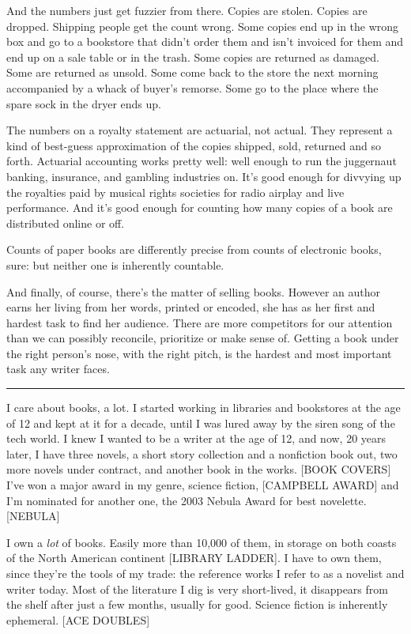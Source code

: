 And the numbers just get fuzzier from there. Copies are stolen.
Copies are dropped. Shipping people get the count wrong. Some
copies end up in the wrong box and go to a bookstore that didn't
order them and isn't invoiced for them and end up on a sale table
or in the trash. Some copies are returned as damaged. Some are
returned as unsold. Some come back to the store the next morning
accompanied by a whack of buyer's remorse. Some go to the place
where the spare sock in the dryer ends up.

The numbers on a royalty statement are actuarial, not actual. They
represent a kind of best-guess approximation of the copies shipped,
sold, returned and so forth. Actuarial accounting works pretty
well: well enough to run the juggernaut banking, insurance, and
gambling industries on. It's good enough for divvying up the
royalties paid by musical rights societies for radio airplay and
live performance. And it's good enough for counting how many copies
of a book are distributed online or off.

Counts of paper books are differently precise from counts of
electronic books, sure: but neither one is inherently countable.

And finally, of course, there's the matter of selling books.
However an author earns her living from her words, printed or
encoded, she has as her first and hardest task to find her
audience. There are more competitors for our attention than we can
possibly reconcile, prioritize or make sense of. Getting a book
under the right person's nose, with the right pitch, is the hardest
and most important task any writer faces.

\begin{center}\rule{3in}{0.4pt}\end{center}

I care about books, a lot. I started working in libraries and
bookstores at the age of 12 and kept at it for a decade, until I
was lured away by the siren song of the tech world. I knew I wanted
to be a writer at the age of 12, and now, 20 years later, I have
three novels, a short story collection and a nonfiction book out,
two more novels under contract, and another book in the works.
[BOOK COVERS] I've won a major award in my genre, science fiction,
[CAMPBELL AWARD] and I'm nominated for another one, the 2003 Nebula
Award for best novelette. [NEBULA]

I own a \emph{lot} of books. Easily more than 10,000 of them, in
storage on both coasts of the North American continent [LIBRARY
LADDER]. I have to own them, since they're the tools of my trade:
the reference works I refer to as a novelist and writer today. Most
of the literature I dig is very short-lived, it disappears from the
shelf after just a few months, usually for good. Science fiction is
inherently ephemeral. [ACE DOUBLES]

